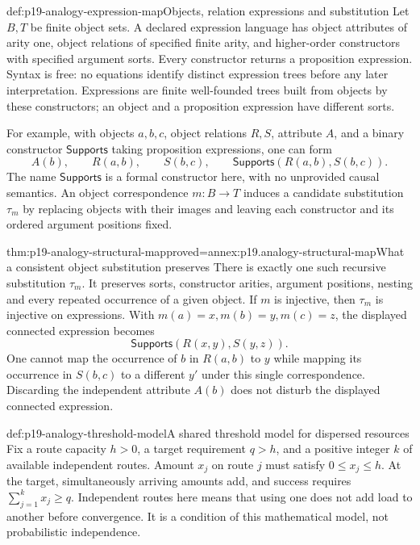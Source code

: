 \begin{hbdefinition}{def:p19-analogy-expression-map}{Objects, relation expressions and substitution}
Let \(B,T\) be finite object sets. A declared expression
language has object attributes of arity one, object
relations of specified finite arity, and higher-order
constructors with specified argument sorts.
Every constructor returns a proposition expression.
Syntax is free: no equations identify distinct expression
trees before any later interpretation.
Expressions are finite well-founded trees built from
objects by these constructors; an object and a
proposition expression have different sorts.

For example, with objects \(a,b,c\), object relations
\(R,S\), attribute \(A\), and a binary constructor
\(\mathsf{Supports}\) taking proposition expressions,
one can form
\[
 A(b),\qquad R(a,b),\qquad S(b,c),\qquad
             \mathsf{Supports}(R(a,b),S(b,c)).
\]
The name \(\mathsf{Supports}\) is a formal constructor
here, with no unprovided causal semantics.
An object correspondence \(m:B\to T\) induces a
candidate substitution \(\tau_m\) by replacing objects
with their images and leaving each constructor
and its ordered argument positions fixed.
\end{hbdefinition}

\begin{hbtheorem}{thm:p19-analogy-structural-map}{proved=annex:p19.analogy-structural-map}{What a consistent object substitution preserves}
There is exactly one such recursive substitution
\(\tau_m\). It preserves sorts, constructor arities,
argument positions, nesting and every repeated
occurrence of a given object. If \(m\) is injective,
then \(\tau_m\) is injective on expressions.
With \(m(a)=x,m(b)=y,m(c)=z\), the displayed
connected expression becomes
\[
        \mathsf{Supports}(R(x,y),S(y,z)).
\]
One cannot map the occurrence of \(b\) in \(R(a,b)\)
to \(y\) while mapping its occurrence in \(S(b,c)\)
to a different \(y'\) under this single correspondence.
Discarding the independent attribute \(A(b)\)
does not disturb the displayed connected expression.
\end{hbtheorem}

\begin{hbdefinition}{def:p19-analogy-threshold-model}{A shared threshold model for dispersed resources}
Fix a route capacity \(h>0\), a target requirement
\(q>h\), and a positive integer \(k\) of available
independent routes. Amount \(x_j\) on route \(j\)
must satisfy \(0\le x_j\le h\). At the target,
simultaneously arriving amounts add, and success
requires \(\sum_{j=1}^k x_j\ge q\).
Independent routes here means that using one
does not add load to another before convergence.
It is a condition of this mathematical model,
not probabilistic independence.
\end{hbdefinition}

